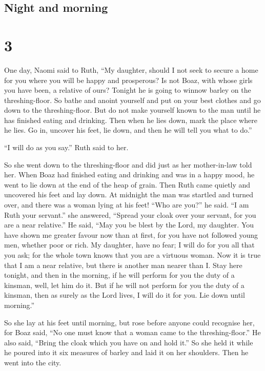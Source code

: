 \hypertarget{night-and-morning}{%
\subsection{Night and morning}\label{night-and-morning}}

\hypertarget{section-2}{%
\section{3}\label{section-2}}

 One day, Naomi said to Ruth, ``My daughter, should I not
seek to secure a home for you where you will be happy and prosperous?
 Is not Boaz, with whose girls you have been, a relative of
ours?  Tonight he is going to winnow barley on the
threshing-floor. So bathe and anoint yourself and put on your best
clothes and go down to the threshing-floor. But do not make yourself
known to the man until he has finished eating and drinking. 
Then when he lies down, mark the place where he lies. Go in, uncover his
feet, lie down, and then he will tell you what to do.''

 ``I will do as you say.'' Ruth said to her.

 So she went down to the threshing-floor and did just as her
mother-in-law told her.  When Boaz had finished eating and
drinking and was in a happy mood, he went to lie down at the end of the
heap of grain. Then Ruth came quietly and uncovered his feet and lay
down.  At midnight the man was startled and turned over, and
there was a woman lying at his feet!  ``Who are you?'' he
said. ``I am Ruth your servant.'' she answered, ``Spread your cloak over
your servant, for you are a near relative.''  He said,
``May you be blest by the Lord, my daughter. You have shown me greater
favour now than at first, for you have not followed young men, whether
poor or rich.  My daughter, have no fear; I will do for you
all that you ask; for the whole town knows that you are a virtuous
woman.  Now it is true that I am a near relative, but there
is another man nearer than I.  Stay here tonight, and then
in the morning, if he will perform for you the duty of a kinsman, well,
let him do it. But if he will not perform for you the duty of a kinsman,
then as surely as the Lord lives, I will do it for you. Lie down until
morning.''

 So she lay at his feet until morning, but rose before
anyone could recognise her, for Boaz said, ``No one must know that a
woman came to the threshing-floor.''  He also said, ``Bring
the cloak which you have on and hold it.'' So she held it while he
poured into it six measures of barley and laid it on her shoulders. Then
he went into the city.

